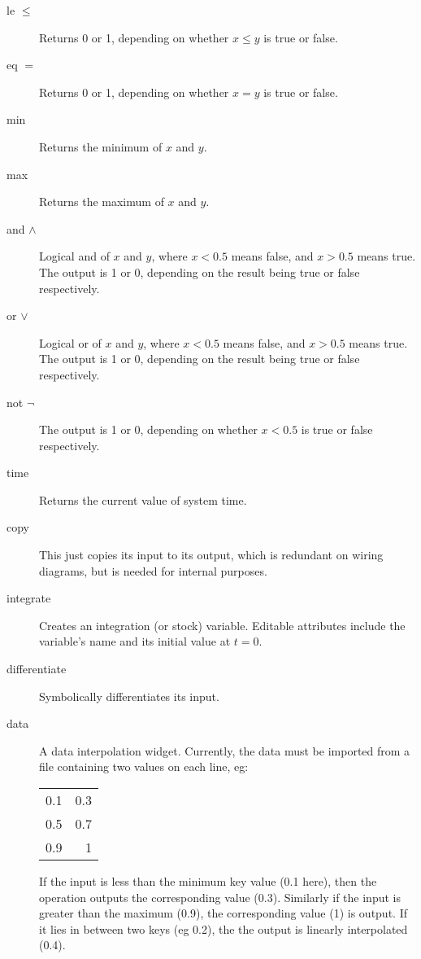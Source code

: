\begin{description}
\item[le $\le$]\label{op:le} Returns 0 or 1, depending
  on whether $x\le y$ is true or false.

\item[eq $=$]\label{op:eq} Returns 0 or 1, depending
  on whether $x=y$ is true or false.

\item[min]\label{op:min} Returns the minimum of $x$ and $y$.

\item[max]\label{op:max} Returns the maximum of $x$ and $y$.

\item[and $\wedge$]\label{op:and_} Logical and of $x$ and $y$, where $x<0.5$
  means false, and $x>0.5$ means true. The output is 1 or 0, depending
  on the result being true or false respectively.

\item[or $\vee$]\label{op:or_} Logical or of $x$ and $y$, where $x<0.5$
  means false, and $x>0.5$ means true. The output is 1 or 0, depending
  on the result being true or false respectively.

\item[not $\neg$]\label{op:not_} The output is 1 or 0, depending
  on whether $x<0.5$ is true or false respectively.

\item[time]\label{op:time} Returns the current value of system time.

\item[copy]\label{op:copy} This just copies its input to its output,
which is redundant on wiring diagrams, but is needed for internal
purposes.

\item[integrate]\label{op:integrate} Creates an integration (or stock)
variable. Editable attributes include the variable's name and its
initial value at $t=0$.

\item[differentiate]\label{op:differentiate} Symbolically differentiates its input.

\item[data]\label{op:data} A data interpolation widget. Currently, the
data must be imported from a file containing two values on each line,
eg:
\begin{tabular}{rr}
0.1 &0.3\\
0.5 &0.7\\
0.9 &1\\
\end{tabular}
If the input is less than the minimum key value (0.1 here), then the
operation outputs the corresponding value (0.3). Similarly if the
input is greater than the maximum (0.9), the corresponding value (1)
is output. If it lies in between two keys (eg 0.2), the the output is
linearly interpolated (0.4).


\end{description}
